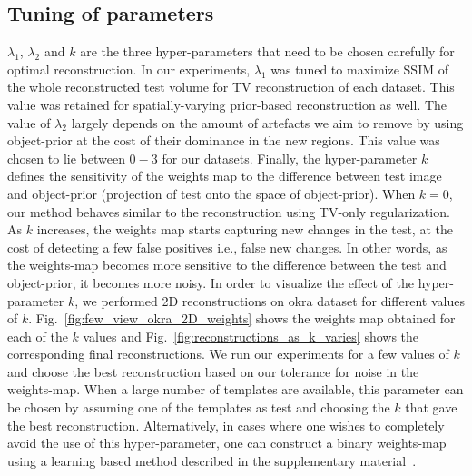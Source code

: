 \documentclass[journal]{IEEEtran}
\begin{document}
\subsection{Tuning of parameters}
$\lambda_1$, $\lambda_2$ and $k$ are the three
hyper-parameters that need to be chosen carefully for optimal
reconstruction. In our experiments, $\lambda_1$ was tuned to maximize
SSIM of the whole reconstructed test volume for TV reconstruction of
each dataset. This value was retained for spatially-varying
prior-based reconstruction as well. The value of $\lambda_2$ largely
depends on the amount of artefacts we aim to remove by using
object-prior at the cost of their dominance in the new regions. This
value was chosen to lie between $0-3$ for our datasets. Finally, the
hyper-parameter $k$ defines the sensitivity of the weights map to the
difference between test image and object-prior (projection of
test onto the space of object-prior). When $k=0$, our method 
behaves similar to the reconstruction using TV-only regularization. As $k$ increases, the weights map starts
capturing new changes in the test, at the cost of detecting a few
false positives i.e., false new changes. In other words, as the
weights-map becomes more sensitive to the difference between the test
and object-prior, it becomes more noisy. In order to visualize the
effect of the hyper-parameter $k$, we performed 2D reconstructions on
okra dataset for different values of
$k$. Fig.~\ref{fig:few_view_okra_2D_weights} shows the weights map
obtained for each of the $k$ values and
Fig.~\ref{fig:reconstructions_as_k_varies} shows the corresponding
final reconstructions. We run our experiments for a few values of $k$
and choose the best reconstruction based on our tolerance for noise
in the weights-map.
When a large number of templates are available, this parameter can be
chosen by assuming one of the templates as test and choosing the $k$
that gave the best reconstruction. Alternatively, in cases where one
wishes to completely avoid the use of this hyper-parameter, one can
construct a binary weights-map using a learning based method described
in the supplementary material~\cite{supp_paper}.

\end{document}
